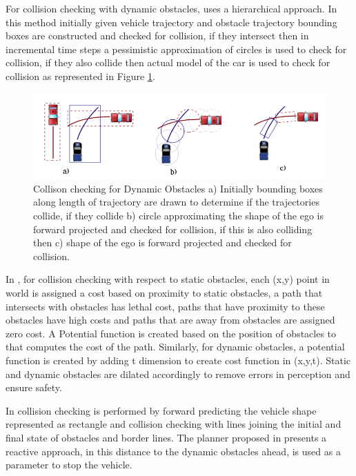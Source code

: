 For collision checking with dynamic obstacles, \cite{kolski_thesis} uses a hierarchical approach. In this method initially given vehicle trajectory and obstacle trajectory bounding boxes are constructed and checked for collision, if they intersect then in incremental time steps a pessimistic approximation of circles is used to check for collision, if they also collide then actual model of the car is used to check for collision as represented in Figure \ref{kolskidynamicobst}.

\begin{figure}
	\centering
	\includegraphics[width=1.0\textwidth]{Images/related_work/kolskidynamicobstacles.png}
	\caption{Collison checking for Dynamic Obstacles \cite{kolski_thesis} a) Initially bounding boxes along length of trajectory are drawn to determine if the trajectories collide, if they collide b) circle approximating the shape of the ego is forward projected and checked for collision, if this is also colliding then c) shape of the ego is forward projected and checked for collision.}
	\label{kolskidynamicobst}
\end{figure} 

In \cite{cmu_parallel_thesis}, for collision checking with respect to static obstacles, each (x,y) point in world is assigned a cost based on proximity to static obstacles, a path that intersects with obstacles has lethal cost, paths that have proximity to these obstacles have high costs and paths that are away from obstacles are assigned zero cost. A Potential function is created based on the position of obstacles to that computes the cost of the path. Similarly, for dynamic obstacles, a potential function is created by adding t dimension to create cost function in (x,y,t). Static and dynamic obstacles are dilated accordingly to remove errors in perception and ensure safety.


In \cite{rrt_star} collision checking is performed by forward predicting the vehicle shape represented as rectangle and collision checking with lines joining the initial and final state of obstacles and border lines. The planner proposed in \cite{volvo_reactive_traj} presents a reactive approach, in this distance to the dynamic obstacles ahead, is used as a parameter to stop the vehicle.

